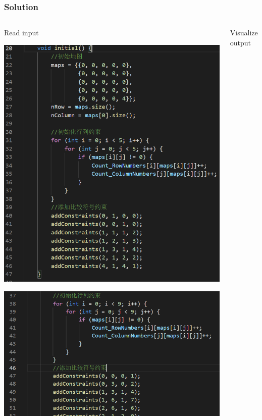 \documentclass{beamer}
\begin{document}
\begin{frame}
  \frametitle{Solution}
  \begin{columns}
    \begin{column}{.5\linewidth}
      Read input
      
      \includegraphics[width=1.0\textwidth]{Pic/ini}

      
      \includegraphics[width=1.0\textwidth]{Pic/addC}
    \end{column}
    \begin{column}{.5\linewidth}
      Visualize output
      

\end{column}
\end{columns}
\end{frame}
\end{document}
